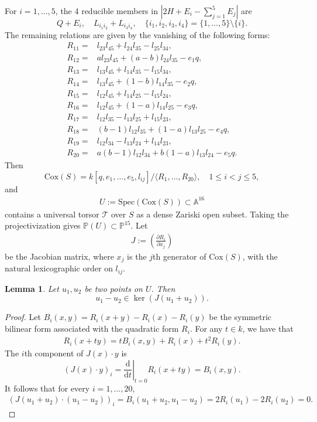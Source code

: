 \documentclass[12pt, reqno]{amsart}
\theoremstyle{plain}
\newtheorem{lemm}[prop]{Lemma}
\theoremstyle{remark}
\theoremstyle{definition}
\numberwithin{equation}{section}
\def\cT{{\mathcal T}}
\def\bA{{\mathbb A}}
\def\bP{{\mathbb P}}
\def\Cox{\mathrm{Cox}}
\def\Spec{\mathrm{Spec}}
\begin{document}
For  $i=1,\ldots,5$, the  4 reducible members in $ |2H+E_i-\sum_{j=1}^5E_j|$ are 
    $$
    Q+E_i,\quad L_{i_1i_2}+L_{i_3i_4}, \quad \{i_1,i_2,i_3,i_4\}=\{1,\ldots,5\}\setminus \{i\}.
    $$
The remaining relations are given by the vanishing of the following forms:
\begin{align*}
R_{11}={}&l_{23}l_{45}+l_{24}l_{35}-l_{25}l_{34},\\
R_{12}={}&a l_{23}l_{45}+(a-b)l_{24}l_{35}-e_1q,\\
R_{13}={}&l_{13}l_{45}+l_{14}l_{35}-l_{15}l_{34},\\
R_{14}={}&l_{13}l_{45}+(1-b)l_{14}l_{35}-e_2q,\\
R_{15}={}&l_{12}l_{45}+l_{14}l_{25}-l_{15}l_{24},\\
R_{16}={}&l_{12}l_{45}+(1-a)l_{14}l_{25}-e_3q,\\
R_{17}={}&l_{12}l_{35}-l_{13}l_{25}+l_{15}l_{23},\\
R_{18}={}&(b-1)l_{12}l_{35}+(1-a)l_{13}l_{25}-e_4q,\\
R_{19}={}&l_{12}l_{34}-l_{13}l_{24}+l_{14}l_{23},\\
R_{20}={}&a(b-1)l_{12}l_{34}+b(1-a)l_{13}l_{24}-e_5q.
\end{align*}   
Then 
$$
 \Cox(S)=k[q,e_1,\ldots,e_5,l_{ij}]/\langle R_1,\ldots, R_{20}\rangle, \quad 1\leq i<j\leq 5,
$$
and
\begin{align}\label{eqn:coxring}
U:=\Spec(\Cox(S))\subset \bA^{16}
\end{align}
contains a universal torsor $\cT$ over $S$ as a dense Zariski open subset. 
Taking the projectivization gives $\bP(U)\subset\bP^{15}$. Let 
\begin{align}\label{eqn:Jacobian}
J:=\left(\frac{\partial R_i}{\partial x_j}\right)
\end{align}
be the Jacobian matrix, where $x_j$ is the $j$th generator of $\Cox(S)$, with the natural lexicographic order on $l_{ij}$.
\begin{lemm}\label{lemm:Jacobian}
Let $u_1,u_2$ be two points on $U$. Then
$$
u_1-u_2\in \ker(J(u_1+u_2)).
$$
\end{lemm}
\begin{proof}
    Let $B_i(x,y)=R_i(x+y)-R_i(x)-R_i(y)$ be the symmetric bilinear form associated with the quadratic form $R_i$.  For any $t\in k$, we have that
    \begin{align*}
        R_i(x+ty)=tB_i(x,y)+R_i(x)+t^2R_i(y).
    \end{align*}
     The $i$th component of $J(x)\cdot y$ is
    $$
   (J(x)\cdot y)_i=\left.\frac{\mathrm d}{\mathrm dt}\right\vert_{t=0}R_i(x+ty)=B_i(x,y).
    $$
    It follows that for every $i=1,\ldots,20$, 
    \begin{align*}
        \left(J(u_1+u_2)\cdot (u_1-u_2)\right)_i=B_i(u_1+u_2,u_1-u_2)=2R_i(u_1)-2R_i(u_2)=0.
    \end{align*}
\end{proof}
\end{document}
